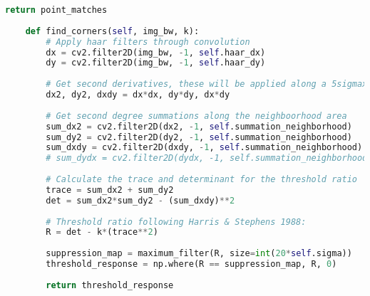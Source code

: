 \documentclass{article}
\begin{document}
\begin{lstlisting}[language=Python]
        return point_matches
    
    def find_corners(self, img_bw, k):
        # Apply haar filters through convolution
        dx = cv2.filter2D(img_bw, -1, self.haar_dx)
        dy = cv2.filter2D(img_bw, -1, self.haar_dy)
        
        # Get second derivatives, these will be applied along a 5sigmax5sigma neighborhood
        dx2, dy2, dxdy = dx*dx, dy*dy, dx*dy
        
        # Get second degree summations along the neighboorhood area
        sum_dx2 = cv2.filter2D(dx2, -1, self.summation_neighborhood)
        sum_dy2 = cv2.filter2D(dy2, -1, self.summation_neighborhood)
        sum_dxdy = cv2.filter2D(dxdy, -1, self.summation_neighborhood)
        # sum_dydx = cv2.filter2D(dydx, -1, self.summation_neighborhood)
        
        # Calculate the trace and determinant for the threshold ratio
        trace = sum_dx2 + sum_dy2
        det = sum_dx2*sum_dy2 - (sum_dxdy)**2
        
        # Threshold ratio following Harris & Stephens 1988:
        R = det - k*(trace**2)
        
        suppression_map = maximum_filter(R, size=int(20*self.sigma))
        threshold_response = np.where(R == suppression_map, R, 0)
        
        return threshold_response
\end{lstlisting}
\end{document}
